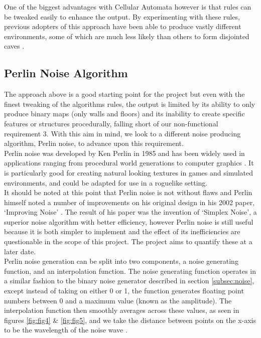 \documentclass[12pt,a4paper]{article}
\begin{document}
One of the biggest advantages with Cellular Automata however is that rules can be tweaked easily to enhance the output. By experimenting with these rules, previous adopters of this approach have been able to produce vastly different environments, some of which are much less likely than others to form disjointed caves \cite{roguebasin}. \\


\subsection{Perlin Noise Algorithm}

The approach above is a good starting point for the project but even with the finest tweaking of the algorithms rules, the output is limited by its ability to only produce binary maps (only walls and floors) and its inability to create specific features or structures procedurally, falling short of our non-functional requirement 3. With this aim in mind, we look to a different noise producing algorithm, Perlin noise, to advance upon this requirement. \\


Perlin noise was developed by Ken Perlin in 1985 and has been widely used in applications ranging from procedural world generations to computer graphics \cite{imagesynth} \cite{surveyPNF}. It is particularly good for creating natural looking textures in games and simulated environments, and could be adapted for use in a roguelike setting.\\

It should be noted at this point that Perlin noise is not without flaws and Perlin himself noted a number of improvements on his original design in his 2002 paper, `Improving Noise' \cite{improvepnoise}. The result of his paper was the invention of `Simplex Noise', a superior noise algorithm with better efficiency, however Perlin noise is still useful because it is both simpler to implement and the effect of its inefficiencies are questionable in the scope of this project. The project aims to quantify these at a later date. \\

Perlin noise generation can be split into two components, a noise generating function, and an interpolation function. The noise generating function operates in a similar fashion to the binary noise generator described in section \ref{subsec:noise}, except instead of taking on either 0 or 1, the function generates floating point numbers between 0 and a maximum value (known as the amplitude). The interpolation function then smoothly averages across these values, as seen in figures \ref{fig:fig4} \& \ref{fig:fig5}, and we take the distance between points on the x-axis to be the wavelength of the noise wave \cite{Howuseperlin}. 
\end{document}
